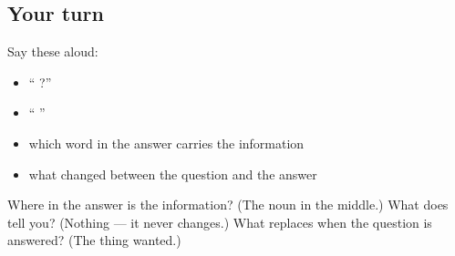 \subsection*{Your turn}
Say these aloud:

\begin{itemize}
\raggedright
  \item \textquotedblleft{}  ?\textquotedblright{}
  \item \textquotedblleft{}  \textquotedblright{}
  \item which word in the answer carries the information
  \item what changed between the question and the answer
\end{itemize}

\begin{tcolorbox}[breakable,colback=teal!4,colframe=teal!35!black,title={Before you move on}]
Where in the answer is the information? (The noun in the middle.) What does \textbf{} tell you? (Nothing — it never changes.) What replaces \textbf{} when the question is answered? (The thing wanted.)
\end{tcolorbox}
